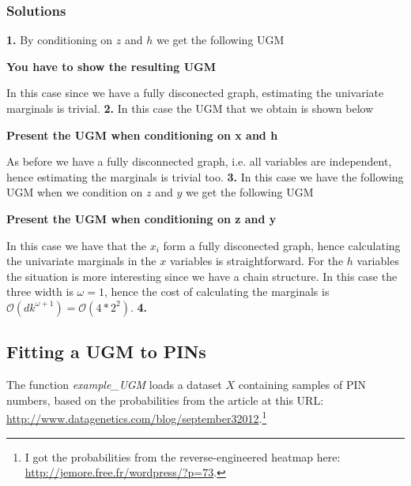 \documentclass{article}
\begin{document}
\subsubsection*{Solutions}

\textbf{1.}
By conditioning on $z$ and $h$ we get the following UGM
\begin{center}
\textbf{You have to show the resulting  UGM}
\end{center}
In this case since we have a fully disconected graph, estimating the univariate marginals is trivial.
\newline
\newline
\textbf{2.}
\newline
In this case the UGM that we obtain is shown below
\begin{center}
\textbf{Present the UGM when conditioning on x and h}
\end{center}
As before we have a fully disconnected graph, i.e. all variables are independent, hence estimating the marginals is trivial too.
\newline
\newline
\textbf{3.}
\newline
In this case we have the following UGM when we condition on $z$ and $y$ we get the following UGM
\begin{center}
\textbf{Present the UGM when conditioning on z and y}
\end{center}
In this case we have that the $x_{i}$ form a fully disconected graph, hence calculating the univariate marginals in the $x$ variables
is straightforward. For the $h$ variables the situation is more interesting since we have a chain structure. In this case the three
width is $\omega=1$, hence the cost of calculating the marginals is $\mathcal{O}(dk^{\omega+1})=\mathcal{O}(4*2^{2})$.
\newline
\newline
\textbf{4.}
\newline











\subsection{Fitting a UGM to PINs}

The function \emph{example\_UGM} loads a dataset $X$ containing samples of PIN numbers, based on the probabilities from the article at this URL: \url{http://www.datagenetics.com/blog/september32012}.\footnote{I got the probabilities from the reverse-engineered heatmap here: \url{http://jemore.free.fr/wordpress/?p=73}.}
\end{document}
